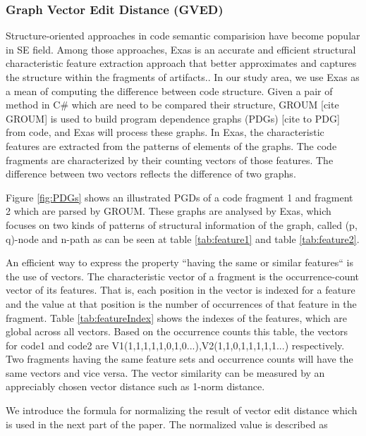 \subsubsection{\textbf{Graph Vector Edit Distance (GVED)}} 
Structure-oriented approaches in code semantic comparision have become popular in SE field. Among those approaches, Exas is an accurate and efficient structural characteristic feature extraction approach that better approximates and captures the structure within the fragments of artifacts.\cite{Accurate and Efficient Structural Characteristic Feature Extraction for Clone Detection}.
In our study area, we use Exas as a mean of computing the difference between code structure. Given a pair of method in C\# which are need to be compared their structure, GROUM [cite GROUM] is used to build program dependence graphs (PDGs) [cite to PDG] from code, and Exas will process these graphs. In Exas, the characteristic features are extracted from the patterns of elements of the graphs. The code fragments are characterized by their counting vectors of those features. The difference between two vectors reflects the difference of two graphs. 



Figure \ref{fig:PDGs} shows an illustrated PGDs of a code fragment 1 and fragment 2 which are parsed by GROUM. These graphs are analysed by Exas, which focuses on two kinds of patterns of structural information of the graph, called (p, q)-node and n-path as can be seen at table \ref{tab:feature1} and table \ref{tab:feature2}. 

An efficient way to express the property ``having the same or similar features`` is the use of vectors. The characteristic vector of a fragment is the occurrence-count vector of its features. That is, each position in the vector is indexed for a feature and the value at that position is the number of occurrences of that feature in the fragment. Table \ref{tab:featureIndex} shows the indexes of the features, which are global across all vectors. Based on the occurrence counts this table, the vectors for code1 and code2 are V1(1,1,1,1,1,0,1,0...),V2(1,1,0,1,1,1,1,1...) respectively. Two fragments having the same feature sets and occurrence counts will have the same vectors and vice versa. The vector similarity can be measured by an appreciably chosen vector distance such as 1-norm distance.

We introduce the formula for normalizing the result of vector edit distance which is used in the next part of the paper. The normalized value is described as

